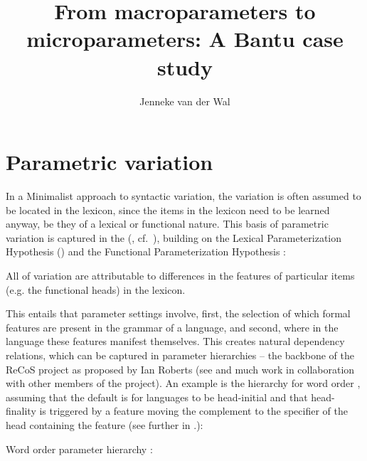 \documentclass[output=paper]{langsci/langscibook}
\author{Jenneke van der Wal\affiliation{Leiden University}}
\title{From macroparameters to microparameters: A Bantu case study}
\begin{document}
\glsresetall

\section{Parametric variation}\label{bkm:Ref347925115}\label{sec:3.1}

In a Minimalist approach to syntactic variation, the variation is often assumed
to be located in the lexicon, since the items in the lexicon need to be learned
anyway, be they of a lexical or functional nature. This basis of parametric
variation is captured in the 
(\citealt[3]{Baker2008}, cf.\ \citealt{Borer1984,Chomsky1995}), building on the
Lexical Parameterization Hypothesis (\citealt{ManziniWexler1987}) and the
Functional Parameterization Hypothesis \citep{Fukui1995}:

\ea All  of variation are attributable to differences in the features
of particular items (e.g. the functional heads) in the lexicon.
\z

This entails that parameter settings involve, first, the selection of which
formal features are present in the grammar of a language, and second, where in
the language these features manifest themselves. This creates natural
dependency relations, which can be captured in parameter hierarchies – the
backbone of the ReCoS project as proposed by Ian Roberts (see
\citealt{RobHol2010,Roberts2012} and much work in
collaboration with other members of the project). An example is the hierarchy
for word order \citep{Roberts2012}, assuming that the default is for languages
to be head-initial \citep{Kayne1994} and that head-finality is triggered by a
feature moving the complement to the specifier of the head containing the
feature (see further in .):

\ea\label{ex:key:3.2} Word order parameter hierarchy \citep{Roberts2012}:
\z
\end{document}
